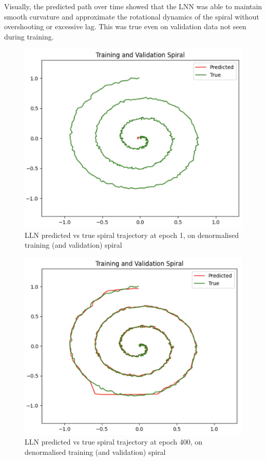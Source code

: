 Visually, the predicted path over time showed that the LNN was able to maintain smooth curvature and approximate the rotational dynamics of the spiral without overshooting or excessive lag. This was true even on validation data not seen during training. 

\begin{figure}[H]
    \centering
    \includegraphics[width=0.8\linewidth]{img/lnn_training_validation_spiral_epoch_1.png}
    \caption{LLN predicted vs true spiral trajectory at epoch 1, on denormalised training (and validation) spiral}
    \label{fig:lnn_training_validation_spiral_epoch_1}
\end{figure}

\begin{figure}[H]
    \centering
    \includegraphics[width=0.8\linewidth]{img/lnn_training_validation_spiral_epoch_400.png}
    \caption{LLN predicted vs true spiral trajectory at epoch 400, on denormalised training (and validation) spiral}
    \label{fig:lnn_training_validation_spiral_epoch_400}
\end{figure}

